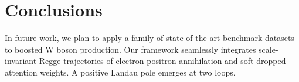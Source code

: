\section{Conclusions}\label{sec:conclusions}

In future work, we plan to apply a family of state-of-the-art benchmark
datasets to boosted W boson production. Our framework seamlessly
integrates scale-invariant Regge trajectories of electron-positron
annihilation and soft-dropped attention weights. A positive Landau pole
emerges at two loops.

